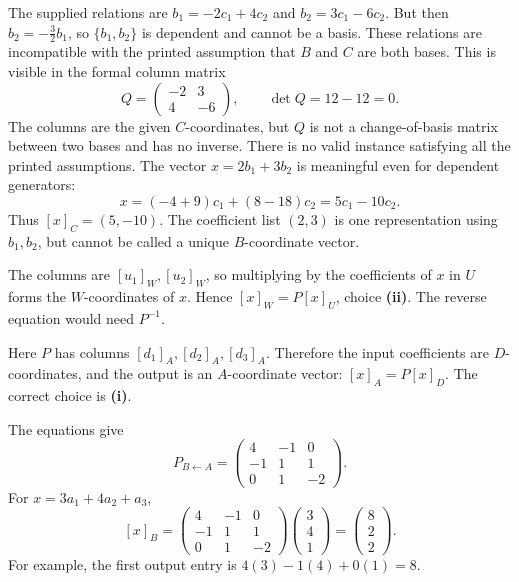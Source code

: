 The supplied relations are $b_1=-2c_1+4c_2$ and $b_2=3c_1-6c_2$.
But then $b_2=-\tfrac32b_1$, so $\{b_1,b_2\}$ is dependent and cannot
be a basis. These relations are incompatible with the printed assumption
that $B$ and $C$ are both bases. This is visible in the formal column matrix
\[
 Q=\begin{pmatrix}-2&3\\4&-6\end{pmatrix},\qquad\det Q=12-12=0.
\]
The columns are the given $C$-coordinates, but $Q$ is not a change-of-basis
matrix between two bases and has no inverse. There is no valid instance
satisfying all the printed assumptions.
The vector $x=2b_1+3b_2$ is meaningful even for dependent generators:
\[
 x=(-4+9)c_1+(8-18)c_2=5c_1-10c_2.
\]
Thus $[x]_C=(5,-10)$. The coefficient list $(2,3)$ is one representation
using $b_1,b_2$, but cannot be called a unique $B$-coordinate vector.

The columns are $[u_1]_W,[u_2]_W$, so multiplying by the coefficients of
$x$ in $U$ forms the $W$-coordinates of $x$. Hence
$[x]_W=P[x]_U$, choice \textbf{(ii)}. The reverse equation would need $P^{-1}$.

Here $P$ has columns $[d_1]_A,[d_2]_A,[d_3]_A$. Therefore the input
coefficients are $D$-coordinates, and the output is an $A$-coordinate vector:
$[x]_A=P[x]_D$. The correct choice is \textbf{(i)}.

The equations give
\[
 P_{B\leftarrow A}=\begin{pmatrix}4&-1&0\\-1&1&1\\0&1&-2\end{pmatrix}.
\]
For $x=3a_1+4a_2+a_3$,
\[
 [x]_B=\begin{pmatrix}4&-1&0\\-1&1&1\\0&1&-2\end{pmatrix}
 \begin{pmatrix}3\\4\\1\end{pmatrix}=\begin{pmatrix}8\\2\\2\end{pmatrix}.
\]
For example, the first output entry is $4(3)-1(4)+0(1)=8$.

